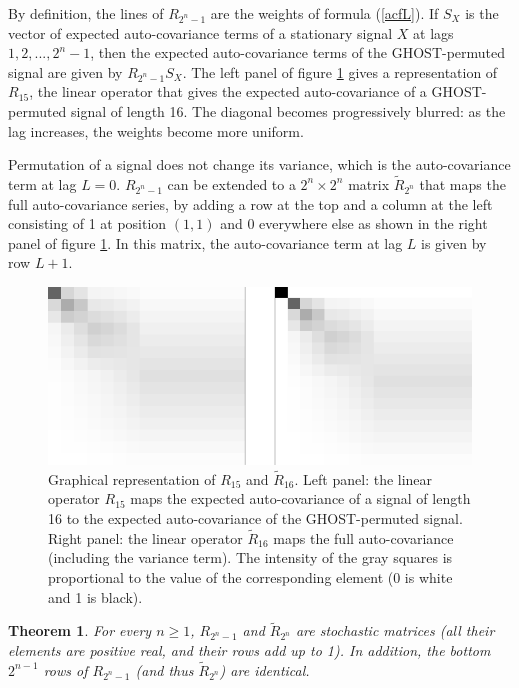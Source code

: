 \documentclass[12pt]{article}
\newtheorem{basictheorem}{Theorem}
\begin{document}
  By definition, the lines of $R_{2^n-1}$ are the weights
  of formula (\ref{acfL}). If $S_X$ is the vector of expected
  auto-covariance terms of a stationary signal $X$ at lags
  $1, 2, ..., 2^n-1$, then the expected auto-covariance terms of the
  GHOST-permuted signal are given by $R_{2^n-1} S_X$.
  The left panel of figure \ref{matrices} gives a representation of
  $R_{15}$, the linear operator that gives the expected auto-covariance
  of a GHOST-permuted signal of length 16. The diagonal becomes
  progressively blurred: as the lag increases, the weights become
  more uniform.

  Permutation of a signal does not change its variance, which is the
  auto-covariance term at lag $L=0$. $R_{2^n-1}$ can be extended to a
  $2^n \times 2^n$ matrix $\tilde{R}_{2^n}$ that maps the
  full auto-covariance series, by adding a row at the top and a column
  at the left consisting of 1 at position $(1,1)$ and 0 everywhere
  else as shown in the right panel of figure \ref{matrices}. In this
  matrix, the auto-covariance term at lag $L$ is given by row $L+1$.

  \begin{figure}[t] 
  \centering
  \includegraphics{matrices_GF110823.pdf}
  \caption{Graphical representation of $R_{15}$ and $\tilde{R}_{16}$.
  Left panel: the linear operator $R_{15}$ maps the expected
  auto-covariance of a signal of length 16 to the expected
  auto-covariance of the GHOST-permuted signal. Right panel: the linear
  operator $\tilde{R}_{16}$ maps the full auto-covariance (including
  the variance term).
  The intensity of the gray squares is proportional to the value of
  the corresponding element (0 is white and 1 is black).}
  \label{matrices}
  \end{figure}

  \begin{basictheorem}\label{stochastic}
    For every $n \geq 1$, $R_{2^n-1}$ and $\tilde{R}_{2^n}$ are
    stochastic matrices (all their elements are positive real, and their
    rows add up to 1). In addition, the bottom $2^{n-1}$ rows of
    $R_{2^n-1}$ (and thus $\tilde{R}_{2^n}$) are identical.
  \end{basictheorem}
\end{document}
